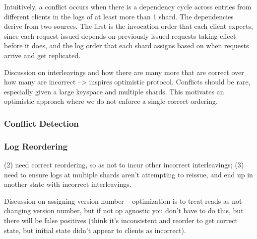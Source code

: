 Intuitively, a conflict occurs when there is a dependency cycle across entries from different clients in the logs of at least more than 1 shard. The dependencies derive from two sources. The first is the invocation order that each client expects, since each request issued depends on previously issued requests taking effect before it does, and the log order that each shard assigns based on when requests arrive and get replicated. 

Discussion on interleavings and how there are many more that are correct over how many are incorrect --> inspires optimistic protocol. Conflicts should be rare, especially given a large keyspace and multiple shards. This motivates an optimistic approach where we do not enforce a single correct ordering.

\subsubsection{Conflict Detection}
\subsubsection{Log Reordering}

(2) need correct reordering, so as not to incur other incorrect interleavings; (3) need to ensure logs at multiple shards aren't attempting to reissue, and end up in another state with incorrect interleavings.

Discussion on assigning version number -- optimization is to treat reads as not changing version number, but if not op agnostic you don't have to do this, but there will be false positives (think it's inconsistent and reorder to get correct state, but initial state didn't appear to clients as incorrect).


